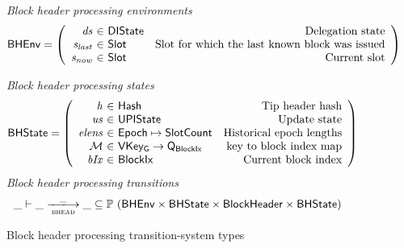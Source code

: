 \documentclass[11pt,a4paper]{article}
\newcommand{\powerset}[1]{\mathbb{P}~#1}
\newcommand{\var}[1]{\mathit{#1}}
\newcommand{\type}[1]{\mathsf{#1}}
\newcommand{\trans}[2]{\xlongrightarrow[\textsc{#1}]{#2}}
\newcommand{\totalf}{\to}
\newcommand{\partialf}{\mapsto}
\newcommand{\Hash}{\type{Hash}}  %
\newcommand{\Slot}{\type{Slot}}
\newcommand{\SlotCount}{\type{SlotCount}}
\newcommand{\BlockIx}{\type{BlockIx}}
\newcommand{\Queue}{\type{Q}}
\newcommand{\VKeyGen}{\type{VKey_G}}
\newcommand{\DelegState}{\type{DIState}}
\newcommand{\signmapname}{\mathcal{M}}
\begin{document}
\begin{figure}[ht]
  \emph{Block header processing environments}
  \begin{equation*}
    \BHEnv =
    \left(
      \begin{array}{r@{~\in~}lr}
        \var{ds} & \DelegState & \text{Delegation state} \\
        \var{s_{last}} & \Slot & \text{Slot for which the last known block was issued} \\
        \var{s_{now}} & \Slot & \text{Current slot} \\
      \end{array}
    \right)
  \end{equation*}

  \emph{Block header processing states}
  \begin{equation*}
    \BHState =
    \left(
      \begin{array}{r@{~\in~}lr}
        \var{h} & \Hash & \text{Tip header hash} \\
        \var{us} & \UPIState & \text{Update state} \\
        \var{elens} & \Epoch \partialf \SlotCount & \text{Historical epoch lengths} \\
        \signmapname & \VKeyGen \totalf \Queue_\BlockIx & \text{key to block index map} \\
        \var{bIx} & \BlockIx & \text{Current block index} \\
      \end{array}
    \right)
  \end{equation*}
  \emph{Block header processing transitions}
  \begin{equation*}
    \_ \vdash \var{\_} \trans{bhead}{\_} \var{\_} \subseteq
    \powerset (\BHEnv \times \BHState \times \Bhead \times \BHState)
  \end{equation*}
  \caption{Block header processing transition-system types}
  \label{fig:ts-types:bhead}
\end{figure}
\end{document}
